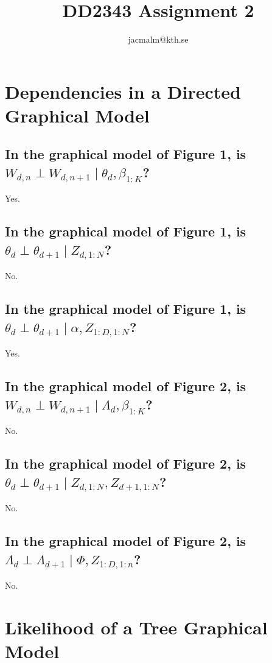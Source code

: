 \documentclass[11pt,a4paper]{article}
\author{jacmalm@kth.se}
\title{DD2343 Assignment 2}
\begin{document}
\maketitle
\newpage

\section{Dependencies in a Directed Graphical Model}
\subsection{In the graphical model of Figure 1, is $W_{d, n} \perp W_{d,n+1} \mid \theta_{d}, \beta_{1:K}$?}
	Yes.
	
\subsection{In the graphical model of Figure 1, is $ \theta_{d} \perp \theta_{d+1} \mid Z_{d, 1:N}$?}

No.

\subsection{In the graphical model of Figure 1, is $ \theta_{d} \perp \theta_{d+1} \mid \alpha, Z_{1:D, 1:N}$?}

Yes.

\subsection{In the graphical model of Figure 2, is $ W_{d, n} \perp W_{d,n+1} \mid \Lambda_{d}, \beta_{1:K} $?}

No.

\subsection{In the graphical model of Figure 2, is $ \theta_{d} \perp \theta_{d+1} \mid Z_{d, 1:N}, Z_{d+1, 1:N}$?}

No.

\subsection{In the graphical model of Figure 2, is $ \Lambda_{d} \perp \Lambda_{d + 1} \mid \Phi, Z_{1:D, 1:n}$?}

No.

\section{Likelihood of a Tree Graphical Model}
\end{document}
